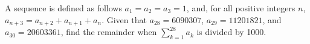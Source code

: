 A sequence is defined as follows $a_1=a_2=a_3=1$, and, for all positive integers $n$, $a_{n+3}=a_{n+2}+a_{n+1}+a_n$. Given that $a_{28}=6090307$, $a_{29}=11201821$, and $a_{30}=20603361$, find the remainder when $\displaystyle \sum^{28}_{k=1} a_k$ is divided by 1000.